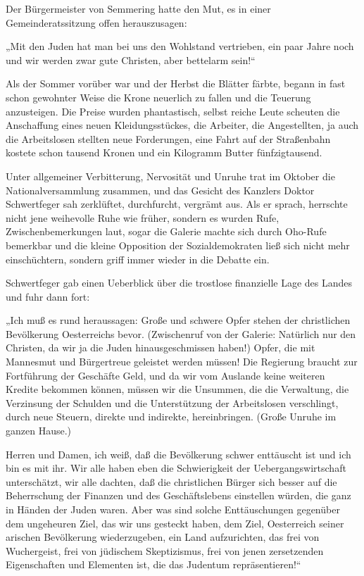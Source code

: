 Der Bürgermeister von Semmering hatte den Mut, es in einer
Gemeinderatssitzung offen herauszusagen:

„Mit den Juden hat man bei uns den Wohlstand vertrieben, ein paar
Jahre noch und wir werden zwar gute Christen, aber bettelarm
sein!“

\tb{* * *}
Als der Sommer vorüber war und der Herbst die Blätter färbte,
begann in fast schon gewohnter Weise die Krone neuerlich zu fallen
und die Teuerung anzusteigen. Die Preise wurden phantastisch,
selbst reiche Leute scheuten die Anschaffung eines neuen
Kleidungsstückes, die Arbeiter, die Angestellten, ja auch die
Arbeitslosen stellten neue Forderungen, eine Fahrt auf der
Straßenbahn kostete  schon tausend Kronen und ein
Kilogramm Butter fünfzigtausend.

Unter allgemeiner Verbitterung, Nervosität und Unruhe trat im
Oktober die Nationalversammlung zusammen, und das Gesicht des
Kanzlers Doktor Schwertfeger sah zerklüftet, durchfurcht, vergrämt
aus. Als er sprach, herrschte nicht jene weihevolle Ruhe wie
früher, sondern es wurden Rufe, Zwischenbemerkungen laut, sogar die
Galerie machte sich durch Oho-Rufe bemerkbar und die kleine
Opposition der Sozialdemokraten ließ sich nicht mehr einschüchtern,
sondern griff immer wieder in die Debatte ein.

Schwertfeger gab einen Ueberblick über die trostlose finanzielle
Lage des Landes und fuhr dann fort:

„Ich muß es rund heraussagen: Große und schwere Opfer stehen der
christlichen Bevölkerung Oesterreichs bevor. (Zwischenruf von der
Galerie: Natürlich nur den Christen, da wir ja die Juden
hinausgeschmissen haben!) Opfer, die mit Mannesmut und Bürgertreue
geleistet werden müssen! Die Regierung braucht zur Fortführung der
Geschäfte Geld, und da wir vom Auslande keine weiteren Kredite
bekommen können, müssen wir die Unsummen, die die Verwaltung, die
Verzinsung der Schulden und die Unterstützung der Arbeitslosen
verschlingt, durch neue Steuern, direkte und indirekte,
hereinbringen. (Große Unruhe im ganzen Hause.)

 Herren und Damen, ich weiß, daß die
Bevölkerung schwer enttäuscht ist und ich bin es mit ihr. Wir alle
haben eben die Schwierigkeit der Uebergangswirtschaft unterschätzt,
wir alle dachten, daß die christlichen  Bürger sich
besser auf die Beherrschung der Finanzen und des Geschäftslebens
einstellen würden, die ganz in Händen der Juden waren. Aber was
sind solche Enttäuschungen gegenüber dem ungeheuren Ziel, das wir
uns gesteckt haben, dem Ziel, Oesterreich seiner arischen
Bevölkerung wiederzugeben, ein Land aufzurichten, das frei von
Wuchergeist, frei von jüdischem Skeptizismus, frei von jenen
zersetzenden Eigenschaften und Elementen ist, die das Judentum
repräsentieren!“

